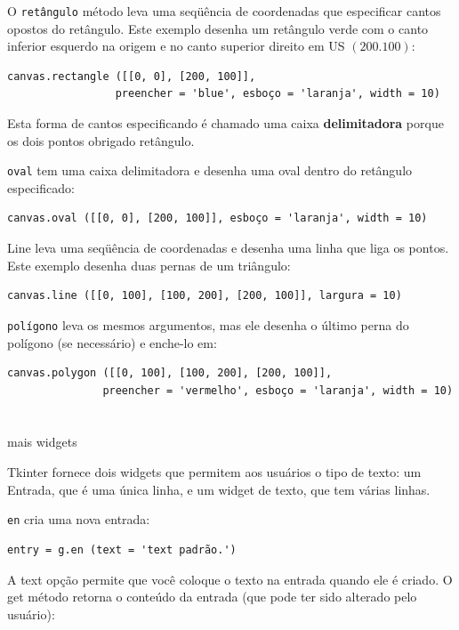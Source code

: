 \documentclass[10pt]{book}
\begin{document}
\begin{exercise}
\begin{v erbatim}
O {\tt retângulo} método leva uma seqüência de coordenadas que
especificar cantos opostos do retângulo. Este exemplo
desenha um retângulo verde com o canto inferior esquerdo na origem
e no canto superior direito em US $ (200.100) $:

\begin{verbatim}
canvas.rectangle ([[0, 0], [200, 100]], 
                 preencher = 'blue', esboço = 'laranja', width = 10)
\end{verbatim}
%
Esta forma de cantos especificando é chamado
uma caixa {\bf delimitadora} porque os dois pontos
obrigado retângulo.

{\tt oval} tem uma caixa delimitadora e desenha uma oval
dentro do retângulo especificado:

\begin{verbatim}
canvas.oval ([[0, 0], [200, 100]], esboço = 'laranja', width = 10)
\end{verbatim}
%
{Line \tt} leva uma seqüência de coordenadas e desenha
uma linha que liga os pontos. Este exemplo desenha duas pernas
de um triângulo:

\begin{verbatim}
canvas.line ([[0, 100], [100, 200], [200, 100]], largura = 10)
\end{verbatim}
%
{\tt polígono} leva os mesmos argumentos, mas ele desenha o último
perna do polígono (se necessário) e enche-lo em:

\begin{verbatim}
canvas.polygon ([[0, 100], [100, 200], [200, 100]],
               preencher = 'vermelho', esboço = 'laranja', width = 10)
\end{verbatim}
%


\section{} mais widgets

Tkinter fornece dois widgets que permitem aos usuários o tipo de texto: um
Entrada, que é uma única linha, e um widget de texto, que tem
várias linhas.

{\tt en} cria uma nova entrada:

\begin{verbatim}
entry = g.en (text = 'text padrão.')
\end{verbatim}
%
A {text \tt} opção permite que você coloque o texto na entrada
quando ele é criado. O {get \tt} método retorna o conteúdo
da entrada (que pode ter sido alterado pelo usuário):


\end{v erbatim}
\end{exercise}
\end{document}
